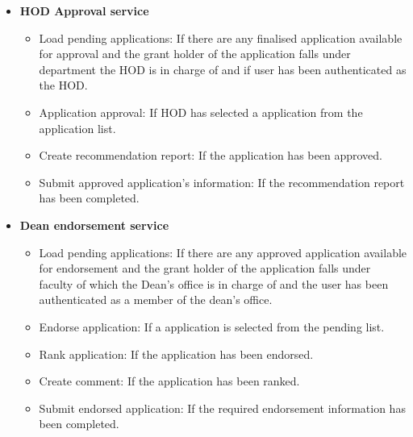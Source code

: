 \documentclass[12pt]{article}
\begin{document}
\begin{itemize}
	\item \textbf{HOD Approval service}
		\begin{itemize}
			\item Load pending applications: If there are any finalised application available for approval and the grant holder of the application falls under department the HOD is in charge of and if user has been authenticated as the HOD.
			\item Application approval: If HOD has selected a application from the application list. 
			\item Create recommendation report: If the application has been approved.				
			\item Submit approved application's information: If the recommendation report has been completed.									
		\end{itemize}
		
	\item \textbf{Dean endorsement service}
		\begin{itemize}
			\item Load pending applications: If there are any approved application available for endorsement and the grant holder of the application falls under faculty of which the Dean's office is in charge of and the user has been authenticated as a member of the dean's office.
			\item Endorse application: If a application is selected from the pending list. 
			\item Rank application: If the application has been endorsed.	
			\item Create comment: If the application has been ranked.			
			\item Submit endorsed application: If the required endorsement information has been completed.									
		\end{itemize}
	

\end{itemize}
\end{document}
